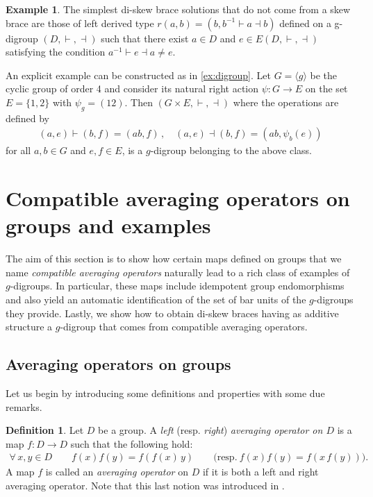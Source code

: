 \documentclass[preprint,1p]{elsarticle}
\numberwithin{equation}{section}
\theoremstyle{definition}               %
\newtheorem{defin}[theor]{Definition}
\newtheorem{ex}[theor]{Example}
\begin{document}
{\begin{ex}
    The simplest di-skew brace solutions that do not come from a skew brace are those of left derived type $r(a,b) = (b, b^{-1} \vdash a \dashv b)$ defined on a g-digroup $(D,\vdash,\dashv)$ such that there exist $a \in D$ and $e \in E(D,\vdash,\dashv)$ satisfying the condition $a^{-1} \vdash e \dashv a \neq e$.

    An explicit example can be constructed as in \cref{ex:digroup}.
    Let $G = \langle g \rangle$ be the cyclic group of order 4 and consider its natural right action $\psi:G \to E$ on the set $E = \{1,2\}$ with $\psi_g = (12)$.
    Then $(G \times E,\vdash,\dashv)$ where the operations are defined by
    \begin{align*}
        (a,e) \vdash (b,f) = (ab,f) \,,\quad (a,e) \dashv (b,f) = (ab,\psi_b(e))
    \end{align*}
    for all $a,b \in G$ and $e,f \in E$, is a $g$-digroup belonging to the above class.
    \end{ex}}

\smallskip

\section{Compatible averaging operators on groups and examples}\label{Sec3}

The aim of this section is to show how certain maps defined on groups that we name \emph{compatible averaging operators} naturally lead to a rich class of examples of $g$-digroups. In particular, these maps include idempotent group endomorphisms and also yield an automatic identification of the set of bar units of the $g$-digroups they provide. Lastly, we show how to obtain di-skew braces having as additive structure a $g$-digroup that comes from compatible averaging operators.
\smallskip

\subsection{Averaging operators on groups}
Let us begin by introducing some definitions and properties with some due remarks.

\begin{defin}
    Let $D$ be a group.
    A \emph{left} (resp. \emph{right}) \emph{averaging operator on $D$} is a map $f:D \to D$ such that the following hold:
    \begin{align}\label{eq:la-ra-op}
        \forall\, x,y \in D\qquad 
        f\left(x\right) f\left(y\right)
        = f\left(f\left(x\right)\, y\right)
        \qquad \text{(resp.} \ f\left(x\right) f\left(y\right)
        = f\left(x\, f\left(y\right)\right)\text{)}.
    \end{align}
    A map $f$ is called an \emph{averaging operator} on $D$ if it is both a left and right averaging operator. Note that this last notion was introduced in \cite{ZhGa24x}.
\end{defin}
\end{document}
